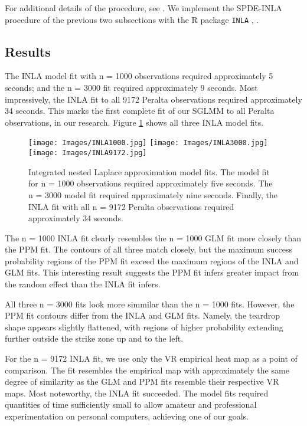 For additional details of the procedure, see \cite{Rue2009}. We implement the SPDE-INLA procedure of the previous two subsections with the R package \verb|INLA| \citep{INLA}, \citep{Lindgren2015}.
        
\subsection{Results}
The INLA model fit with n = 1000 observations required approximately 5 seconds; and the n = 3000 fit required approximately 9 seconds. Most impressively, the INLA fit to all 9172 Peralta observations required approximately 34 seconds. This marks the first complete fit of our SGLMM to all Peralta observations, in our research. Figure \ref{fig:INLA} shows all three INLA model fits.
  \begin{figure}[H]
	\centering 
	\texttt{[image: Images/INLA1000.jpg]}	
	\texttt{[image: Images/INLA3000.jpg]}
	\texttt{[image: Images/INLA9172.jpg]}
	\caption{Integrated nested Laplace approximation model fits. The model fit for n = 1000 observations required approximately five seconds. The n = 3000 model fit required approximately nine seconds. Finally, the INLA fit with all n = 9172 Peralta observations required approximately 34 seconds.}
	\label{fig:INLA}
	\end{figure}
The n = 1000 INLA fit clearly resembles the n = 1000 GLM fit more closely than the PPM fit. The contours of all three match closely, but the maximum success probability regions of the PPM fit exceed the maximum regions of the INLA and GLM fits. This interesting result suggests the PPM fit infers greater impact from the random effect than the INLA fit infers. 

All three n = 3000 fits look more simmilar than the n = 1000 fits. However, the PPM fit contours differ from the INLA and GLM fits. Namely, the teardrop shape appears slightly flattened, with regions of higher probability extending further outside the strike zone up and to the left.  

For the n = 9172 INLA fit, we use only the VR empirical heat map as a point of comparison. The fit resembles the empirical map with approximately the same degree of similarity as the GLM and PPM fits resemble their respective VR maps. Most noteworthy, the INLA fit succeeded. The model fits required quantities of time sufficiently small to allow amateur and professional experimentation on personal computers, achieving one of our goals.


